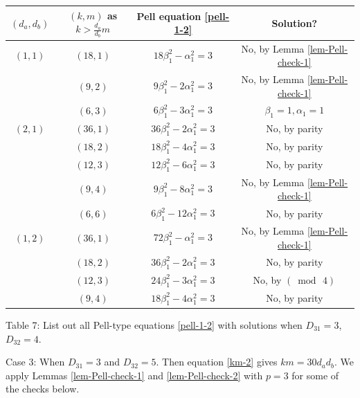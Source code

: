 \documentclass[12pt]{article}
\begin{document}
\begin{center}
\begin{tabular}{|c|c|c|c|}
\hline
$(d_a, d_b)$ & $(k, m)$ as $k > \frac{d_a}{d_b} m$ & Pell equation \eqref{pell-1-2} & Solution? \\
\hline $(1,1)$ & $(18,1)$ & $18\beta_1^2-\alpha_1^2=3$ & No, by Lemma \ref{lem-Pell-check-1} \\
\hline & $(9,2)$ & $9\beta_1^2-2\alpha_1^2=3$ & No, by Lemma \ref{lem-Pell-check-1} \\
\hline & $(6,3)$ & $6\beta_1^2-3\alpha_1^2=3$ & $\beta_1=1, \alpha_1=1$\\
\hline $(2,1)$ & $(36,1)$ & $36\beta_1^2-2\alpha_1^2=3$ & No, by parity\\
\hline & $(18,2)$ & $18\beta_1^2-4\alpha_1^2=3$ & No, by parity\\
\hline & $(12,3)$ & $12\beta_1^2-6\alpha_1^2=3$ & No, by parity \\
\hline & $(9,4)$ & $9\beta_1^2-8\alpha_1^2=3$ & No, by Lemma \ref{lem-Pell-check-1}\\
\hline & $(6,6)$ & $6\beta_1^2-12\alpha_1^2=3$ & No, by parity \\
\hline $(1,2)$ & $(36,1)$ & $72\beta_1^2-\alpha_1^2=3$ & No, by Lemma \ref{lem-Pell-check-1}\\
\hline & $(18,2)$ & $36\beta_1^2-2\alpha_1^2=3$ & No, by parity\\
\hline & $(12,3)$ & $24\beta_1^2-3\alpha_1^2=3$ & No, by $(\bmod \, 4)$\\
\hline & $(9,4)$ & $18\beta_1^2-4\alpha_1^2=3$ & No, by parity \\
\hline
\end{tabular}
\newline \small{Table 7: List out all Pell-type equations \eqref{pell-1-2} with solutions when $D_{31} = 3$, $D_{32} = 4$.}
\end{center}

Case 3: When $D_{31} = 3$ and $D_{32} = 5$. Then equation \eqref{km-2} gives $k m = 30 d_a d_b$. We apply Lemmas \ref{lem-Pell-check-1} and \ref{lem-Pell-check-2} with $p = 3$ for some of the checks below.
\end{document}

